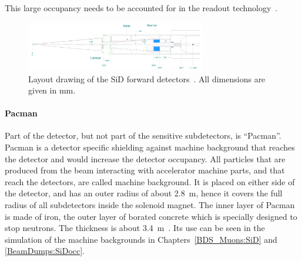 This large occupancy needs to be accounted for in the readout technology~\cite[p. 133ff]{TDR4}.
\begin{figure}[h!]
\centering
\includegraphics[width=0.7\textwidth]{Figures/SiD_Forward.png}
\caption[Drawing of the SiD forward detectors]{Layout drawing of the SiD forward detectors~\cite[p. 134]{TDR4}.
All dimensions are given in mm.}
\label{fig:SiD_Forward}
\end{figure}

\paragraph{Pacman}
Part of the detector, but not part of the sensitive subdetectors, is ``Pacman''.
Pacman is a detector specific shielding against machine background that reaches the detector and would increase the detector occupancy.
All particles that are produced from the beam interacting with accelerator machine parts, and that reach the detectors, are called machine background.
It is placed on either side of the detector, and has an outer radius of about \SI{2.8}{\meter}, hence it covers the full radius of all subdetectors inside the solenoid magnet.
The inner layer of Pacman is made of iron, the outer layer of borated concrete which is specially designed to stop neutrons.
The thickness is about \SI{3.4}{\meter}~\cite{SiD_Geo}.
Its use can be seen in the simulation of the machine backgrounds in Chapters~\ref{BDS_Muons:SiD} and \ref{BeamDumps:SiDocc}.


